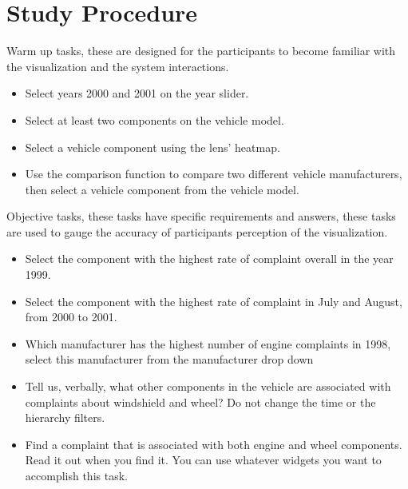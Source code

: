 \appendix


\chapter{Study Procedure}

\noindent 
Warm up tasks, these are designed for the participants to become
familiar with the visualization and the system interactions.

\begin{itemize}[noitemsep]
  \item Select years 2000 and 2001 on the year slider.
  \item Select at least two components on the \threed vehicle model.
  \item Select a vehicle component using the lens' heatmap.
  \item Use the comparison function to compare two different vehicle
  manufacturers, then select a vehicle component from the \threed vehicle model.
\end{itemize}
 


\noindent 
Objective tasks, these tasks have specific requirements and answers, these tasks
are used to gauge the accuracy of participants perception of the \threed
visualization.

\begin{itemize}[noitemsep]
  \item Select the component with the highest rate of complaint overall in the
  year 1999.
  \item Select the component with the highest rate of complaint in July and
  August, from 2000 to 2001.
  \item Which manufacturer has the highest number of engine complaints in 1998,
  select this manufacturer from the manufacturer drop down
  \item Tell us, verbally, what other components in the vehicle are associated
  with complaints about windshield and wheel? Do not change the time or the
  hierarchy filters.
  \item Find a complaint that is associated with both engine and wheel
  components. Read it out when you find it. You can use whatever widgets  you
  want to accomplish this task.
\end{itemize}


